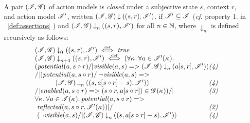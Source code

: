 \begin{definition}
  \label{def:actclos}
  A pair $(\mathscr{I}, \mathscr{G})$ of action models is \emph{closed} under a
  subjective state $s$, context $r$, and action model $\mathscr{I}'$,
  written $(\mathscr{I}, \mathscr{G}) \mathbin{\downarrow} ((s, r), \mathscr{I}')$, if $\mathscr{I}' \subseteq \mathscr{I}$ ({\it cf. } property 1. in ~\ref{def:assertions} ) and 
  $(\mathscr{I}, \mathscr{G}) \mathbin{\downarrow}_{n} ((s, r), \mathscr{I} ')$ for all
  $n\in\mathbb{N}$, where $\downarrow_n$ is defined recursively as follows:
  \vspace{-1ex}
\[
\begin{array}{@{} l @{} }
  \extendsAMUpto{\lmod, \gmod}{\mathrlap{0}\phantom{n}}{s}{r}{\lmod'}
  \iffdef
  \m{true}\\
  \extendsAMUpto{\lmod, \gmod}{n+1}{s}{r}{\lmod'} \iffdef (\V{\ca{}}
  \V{a\in \lmod'(\ca{})}\\
  (\m{potential}(a,s\composeL r)  /| \m{visible}(a, s) => 
  \extendsAMUptob{\lmod,
    \gmod}{n}{a[s, r]}{\lmod'}) \hfill \textit{(4)}\\
  /| (\m{potential}(a,s\composeL r)  /| \neg\m{visible}(a, s) => \\
  	\quad\qquad \extendsAMUpto{\lmod,
    \gmod}{n}{s}{a[s \composeL r] - s}{\lmod'}) \hfill \textit{(4)}\\  
  /| \m{enabled}(a,s\composeL r)
  => (s\composeL r,
  a[s\composeL r])\in \gmod(\ca{}))
  /|\null\hfill \textit{(3)}\\
  \V{\ca{}}\V{a\in \lmod(\ca{})}
  \m{potential}(a,s\composeL r) =>\null\\
  \ \m{reflected}(a,s\composeL r,\lmod'(\ca{})) |/\null\hfill \textit{(2)}\\
  \ (\neg\m{visible}(a,s) /|
  \extendsAMUpto{\lmod, \gmod}{n}{s}{a[s \composeL r] - s}{\lmod'})\hfill \textit{(4)}

\end{array}\]
\end{definition}
